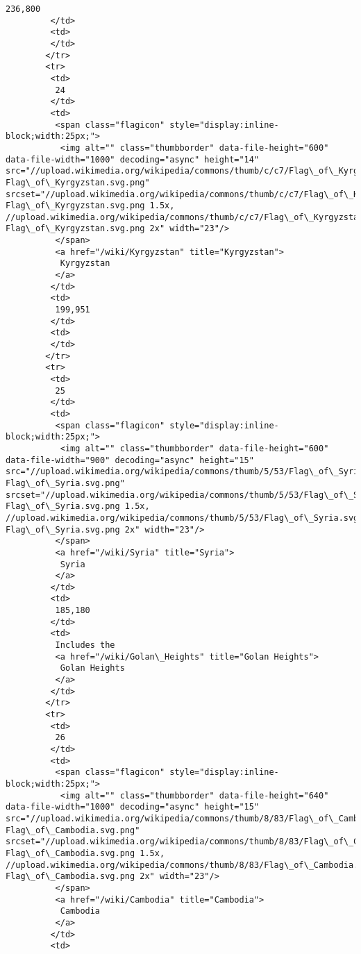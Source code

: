 \documentclass[11pt]{article}
\begin{document}
\begin{Verbatim}[commandchars=\\\{\}]
          236,800
         </td>
         <td>
         </td>
        </tr>
        <tr>
         <td>
          24
         </td>
         <td>
          <span class="flagicon" style="display:inline-block;width:25px;">
           <img alt="" class="thumbborder" data-file-height="600" data-file-width="1000" decoding="async" height="14" src="//upload.wikimedia.org/wikipedia/commons/thumb/c/c7/Flag\_of\_Kyrgyzstan.svg/23px-Flag\_of\_Kyrgyzstan.svg.png" srcset="//upload.wikimedia.org/wikipedia/commons/thumb/c/c7/Flag\_of\_Kyrgyzstan.svg/35px-Flag\_of\_Kyrgyzstan.svg.png 1.5x, //upload.wikimedia.org/wikipedia/commons/thumb/c/c7/Flag\_of\_Kyrgyzstan.svg/46px-Flag\_of\_Kyrgyzstan.svg.png 2x" width="23"/>
          </span>
          <a href="/wiki/Kyrgyzstan" title="Kyrgyzstan">
           Kyrgyzstan
          </a>
         </td>
         <td>
          199,951
         </td>
         <td>
         </td>
        </tr>
        <tr>
         <td>
          25
         </td>
         <td>
          <span class="flagicon" style="display:inline-block;width:25px;">
           <img alt="" class="thumbborder" data-file-height="600" data-file-width="900" decoding="async" height="15" src="//upload.wikimedia.org/wikipedia/commons/thumb/5/53/Flag\_of\_Syria.svg/23px-Flag\_of\_Syria.svg.png" srcset="//upload.wikimedia.org/wikipedia/commons/thumb/5/53/Flag\_of\_Syria.svg/35px-Flag\_of\_Syria.svg.png 1.5x, //upload.wikimedia.org/wikipedia/commons/thumb/5/53/Flag\_of\_Syria.svg/45px-Flag\_of\_Syria.svg.png 2x" width="23"/>
          </span>
          <a href="/wiki/Syria" title="Syria">
           Syria
          </a>
         </td>
         <td>
          185,180
         </td>
         <td>
          Includes the
          <a href="/wiki/Golan\_Heights" title="Golan Heights">
           Golan Heights
          </a>
         </td>
        </tr>
        <tr>
         <td>
          26
         </td>
         <td>
          <span class="flagicon" style="display:inline-block;width:25px;">
           <img alt="" class="thumbborder" data-file-height="640" data-file-width="1000" decoding="async" height="15" src="//upload.wikimedia.org/wikipedia/commons/thumb/8/83/Flag\_of\_Cambodia.svg/23px-Flag\_of\_Cambodia.svg.png" srcset="//upload.wikimedia.org/wikipedia/commons/thumb/8/83/Flag\_of\_Cambodia.svg/35px-Flag\_of\_Cambodia.svg.png 1.5x, //upload.wikimedia.org/wikipedia/commons/thumb/8/83/Flag\_of\_Cambodia.svg/46px-Flag\_of\_Cambodia.svg.png 2x" width="23"/>
          </span>
          <a href="/wiki/Cambodia" title="Cambodia">
           Cambodia
          </a>
         </td>
         <td>

\end{Verbatim}
\end{document}
